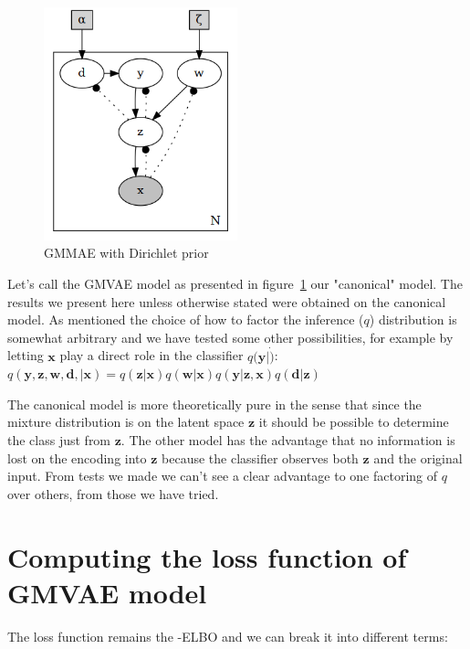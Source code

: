 \documentclass[11pt, a4paper]{report}
\theoremstyle{plain}
\theoremstyle{definition}
\theoremstyle{remark}
\newcommand{\x}{\mathbf{x}}
\newcommand{\z}{\mathbf{z}}
\newcommand{\y}{\mathbf{y}}
\newcommand{\w}{\mathbf{w}}
\newcommand{\dd}{\mathbf{d}}
\begin{document}
\begin{figure}[h]
\centering
\includegraphics[width=0.5\textwidth]{plots/dirichlet_gmm.gv.png}
\caption{GMMAE with Dirichlet prior}
\label{fig:dirgmm}
\end{figure}

Let's call the GMVAE model as presented in figure~\ref{fig:dirgmm} our
"canonical" model. The results we present here unless otherwise stated were
obtained on the canonical model. As mentioned the choice of how to factor the
inference ($q$) distribution is somewhat arbitrary and we have tested some other
possibilities, for example by letting $\x$ play a direct role in the
classifier $q(\y | \dot)$:
$q(\y, \z, \w, \dd, | \x) = 
q(\z | \x)q(\w | \x)q(\y | \z, \x)q(\dd | \z)$ 

The canonical model is more theoretically pure in the sense that since the
mixture distribution is on the latent space $\z$ it should be possible to
determine the class just from $\z$. The other model has the advantage that no
information is lost on the encoding into $\z$ because the classifier observes
both $\z$ and the original input. From tests we made we can't see a clear
advantage to one factoring of $q$ over others, from those we have tried.

\section{Computing the loss function of GMVAE model}

The loss function remains the -ELBO and we can break it into
different terms:
\end{document}
